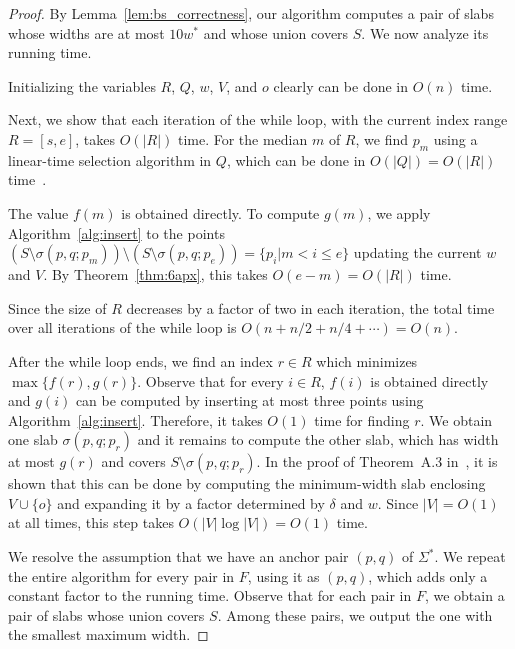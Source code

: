 \documentclass[english,a4paper, cleveref, autoref, thm-restate, nolineno]{socg-lipics-v2021}
\theoremstyle{star}
\theoremstyle{claimstar}
\begin{document}
\begin{proof}
    By Lemma~\ref{lem:bs_correctness}, our algorithm computes a pair of slabs whose widths are at most $10w^*$ and whose union covers $S$.
    We now analyze its running time.

    Initializing the variables $R$, $Q$, $w$, $V$, and $o$ clearly can be done in $O(n)$ time.

    Next, we show that each iteration of the while loop, with the current index range $R = [s, e]$, takes $O(|R|)$ time.
    For the median $m$ of $R$, we find $p_m$ using a linear-time selection algorithm in $Q$, which can be done in $O(|Q|)=O(|R|)$ time~\cite{Blum1973Time_selection}.

    The value $f(m)$ is obtained directly.
    To compute $g(m)$, we apply Algorithm~\ref{alg:insert} to the points $(S\setminus\sigma(p, q; p_m))\setminus (S\setminus\sigma(p, q; p_e))=\{p_i | m < i \le e \}$
    updating the current $w$ and $V$.
    By Theorem~\ref{thm:6apx}, this takes $O(e-m)=O(|R|)$ time.

    Since the size of $R$ decreases by a factor of two in each iteration, the total time over all iterations of the while loop is $O(n + n/2 + n/4 + \cdots) = O(n)$.

    After the while loop ends, we find an index $r\in R$ which minimizes $\max\{f(r), g(r)\}$.
    Observe that for every $i\in R$, $f(i)$ is obtained directly and $g(i)$ can be computed by inserting at most three points using Algorithm~\ref{alg:insert}. 
    Therefore, it takes $O(1)$ time for finding $r$. 
    We obtain one slab $\sigma(p, q;p_r)$ and it remains to compute the other slab, which has width at most $g(r)$ and covers $S \setminus \sigma(p,q;p_r)$.
    In the proof of Theorem~A.3 in~\cite{chan2006faster}, it is shown that this can be done by  computing the minimum-width slab enclosing $V\cup \{ o\}$ and expanding it by a factor determined by $\delta$ and $w$.
    Since $|V|=O(1)$ at all times, this step takes $O(|V|\log |V|)=O(1)$ time.

    We resolve the assumption that we have an anchor pair $(p, q)$ of $\Sigma^*$. We repeat the entire algorithm for every pair in $F$, using it as $(p, q)$, which adds only a constant factor to the running time.
    Observe that for each pair in $F$, we obtain a pair of slabs whose union covers $S$. 
    Among these pairs, we output the one with the smallest maximum width.  
\end{proof}
\end{document}

